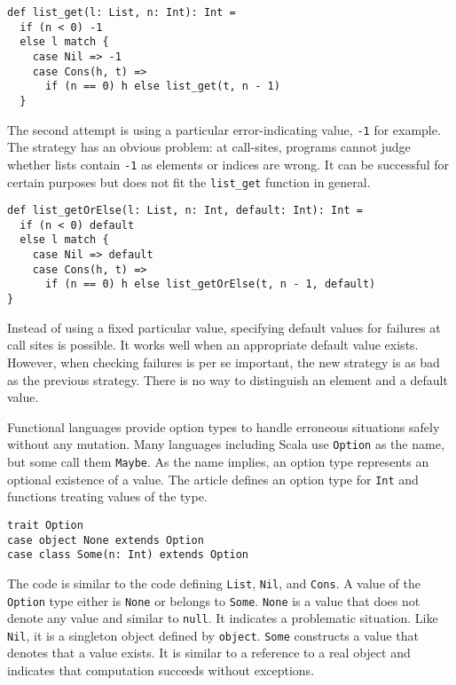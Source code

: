 \begin{verbatim}
def list_get(l: List, n: Int): Int =
  if (n < 0) -1
  else l match {
    case Nil => -1
    case Cons(h, t) =>
      if (n == 0) h else list_get(t, n - 1)
  }
\end{verbatim}

The second attempt is using a particular error-indicating value, \verb!-1! for
example. The strategy has an obvious problem: at call-sites, programs cannot
judge whether lists contain \verb!-1! as elements or indices are wrong. It can be
successful for certain purposes but does not fit the \verb!list_get! function in
general.

\begin{verbatim}
def list_getOrElse(l: List, n: Int, default: Int): Int =
  if (n < 0) default
  else l match {
    case Nil => default
    case Cons(h, t) =>
      if (n == 0) h else list_getOrElse(t, n - 1, default)
}
\end{verbatim}

Instead of using a fixed particular value, specifying default values for failures
at call sites is possible. It works well when an appropriate default value
exists. However, when checking failures is per se important, the new strategy is
as bad as the previous strategy. There is no way to distinguish an element and a
default value.

Functional languages provide option types to handle erroneous situations safely
without any mutation. Many languages including Scala use \verb!Option! as the
name, but some call them \verb!Maybe!. As the name implies, an option type
represents an optional existence of a value. The article defines an option type
for \verb!Int! and functions treating values of the type.

\begin{verbatim}
trait Option
case object None extends Option
case class Some(n: Int) extends Option
\end{verbatim}

The code is similar to the code defining \verb!List!, \verb!Nil!, and
\verb!Cons!. A value of the \verb!Option! type either is \verb!None! or belongs
to \verb!Some!. \verb!None! is a value that does not denote any value and similar
to \verb!null!. It indicates a problematic situation. Like \verb!Nil!, it is a
singleton object defined by \verb!object!. \verb!Some! constructs a value that
denotes that a value exists. It is similar to a reference to a real object and
indicates that computation succeeds without exceptions.

